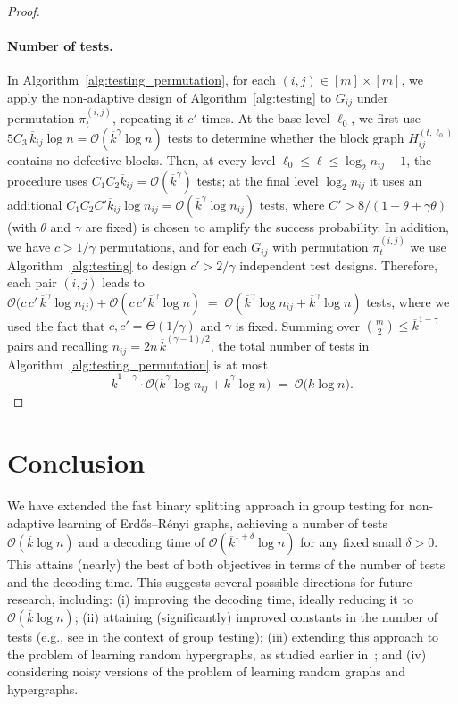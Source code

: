 \documentclass[journal]{IEEEtran}
\theoremstyle{definition}
\theoremstyle{definition}
\newcommand{\kb}{\overline{k}}
\newcommand{\bigO}{\mathcal{O}}
\begin{document}
\begin{proof}
\paragraph{Number of tests.} 
In Algorithm~\ref{alg:testing_permutation}, for each \((i,j)\in[m]\times[m]\), we apply the non-adaptive design of Algorithm~\ref{alg:testing} to \(G_{ij}\) under permutation \(\pi_t^{(i,j)}\), repeating it \(c'\) times.  At the base level \(\ell_0\), we first use \(5C_3\,\kb_{ij}\log n = \bigO(\kb^{\gamma} \log n) \) tests to determine whether the block graph \(H_{ij}^{(t,\ell_0)}\) contains no defective blocks. Then, at every level $\ell_0 \le \ell \le \log_2 n_{ij}-1$, the procedure uses $C_1C_2\kb_{ij} = \bigO(\kb^{\gamma})$ tests; at the final level $\log_2 n_{ij}$ it uses an additional $C_1C_2C'\kb_{ij}\log n_{ij} = \bigO(\kb^{\gamma}\log n_{ij})$ tests, where $C' > 8/(1-\theta +\gamma \theta)$ (with $\theta$ and $\gamma$ are fixed) is chosen to amplify the success probability. 
In addition, we have $c > 1/\gamma$ permutations, and for each $G_{ij}$ with permutation $\pi_t^{(i,j)}$ we use Algorithm~\ref{alg:testing} to design $c' > 2/\gamma$ independent test designs. 
Therefore, each pair $(i,j)$ leads to $\bigO \big(c\,c'\,\kb^{\gamma}\log n_{ij}\big) + \bigO(c \, c'\,\kb^{\gamma} \log n) \;=\; \bigO(\kb^{\gamma}\log n_{ij}+ \kb^{\gamma} \log n)$ tests, where we used the fact that $c,c'=\Theta(1/\gamma)$ and $\gamma$ is fixed. Summing over $\binom{m}{2} \le \kb^{1-\gamma}$ pairs and recalling $n_{ij} = 2n\,\kb^{(\gamma-1)/2}$, the total number of tests in Algorithm~\ref{alg:testing_permutation} is at most
\[
 \kb^{1-\gamma} \cdot \bigO \big(\kb^{\gamma}\log n_{ij} + \kb^{\gamma} \log n\big)
\;=\; \bigO \big(\kb \log n\big).
\]

\end{proof}

\section{Conclusion}

We have extended the fast binary splitting approach in group testing for non-adaptive learning of Erd\H{o}s--R\'enyi graphs, achieving a number of tests $\bigO(\kb \log n)$ and a decoding time of $\bigO(\kb^{1+\delta}\log n)$ for any fixed small $\delta>0$. This attains (nearly) the best of both objectives in terms of the number of tests and the decoding time. This suggests several possible directions for future research, including: (i) improving the decoding time, ideally reducing it to $\bigO(\kb \log n)$; (ii) attaining (significantly) improved constants in the number of tests (e.g., see \cite{wang2023quickly} in the context of group testing); (iii) extending this approach to the problem of learning random hypergraphs, as studied earlier in~\cite{austhof2025non}; and (iv) considering noisy versions of the problem of learning random graphs and hypergraphs.
\end{document}
